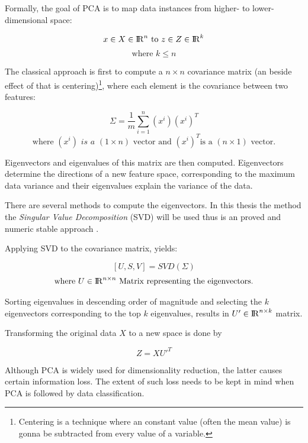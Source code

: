 Formally, the goal of PCA is to map data instances from higher- to lower-dimensional space:

\[ x \in X \in {\rm I\!R}^n \textrm{ to } z \in Z \in {\rm I\!R}^k \]
\[ \textrm{where } k \leq n \]

The classical approach is first to compute a \(n \times n \) covariance matrix (an beside effect of that is centering)\footnote{Centering is a technique where an constant value (often the mean value) is gonna be subtracted from every value of a variable.}, where each element is the covariance between two features:

\[ \Sigma = \frac{1}{m}\sum_{i = 1}^{n}(x^i)(x^i)^T\]
\[ \textrm{where }(x^i) \textit{ is a } (1 \times n) \textrm{ vector and } (x^i)^T \textrm{is a } (n \times 1) \textrm{ vector.}\]

Eigenvectors and eigenvalues of this matrix are then computed. Eigenvectors determine the directions of a new feature space, corresponding to the maximum data variance and their eigenvalues explain the variance of the data.

There are several methods to compute the eigenvectors.
In this thesis the method the \textit{Singular Value Decomposition} (SVD) will be used thus is an proved and numeric stable approach \cite{wall2003svd,zouht04}.  

Applying SVD to the covariance matrix, yields:

\[ [U,S,V] = SVD(\Sigma)\]
\[ \textrm{where  } U \in  {\rm I\!R}^{n \times n} \textrm{ Matrix representing the eigenvectors.}  \]

Sorting eigenvalues in descending order of magnitude and selecting the \( k \) eigenvectors corresponding to the top \( k \) eigenvalues, results in \( U' \in   {\rm I\!R}^{n \times k}\) matrix.

Transforming the original data \( X \) to a new space is done by

\[ Z = X U'^ T \]

Although PCA is widely used for dimensionality reduction, the latter causes certain information loss. The extent of such loss needs to be kept in mind when PCA is followed by data classification. 